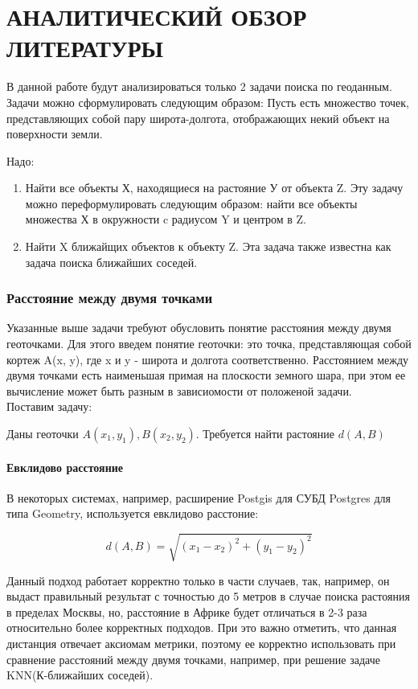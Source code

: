 \chapter{АНАЛИТИЧЕСКИЙ ОБЗОР ЛИТЕРАТУРЫ}
\label{cha:analysis}

В данной работе будут анализироваться только 2 задачи поиска по геоданным. Задачи можно сформулировать следующим образом:
Пусть есть множество точек, представляющих собой пару широта-долгота, отображающих некий объект на поверхности земли.

Надо:
\begin{enumerate}
    \item Найти все объекты Х, находящиеся на растояние У от объекта Z. Эту задачу можно переформулировать следующим образом: найти все объекты множества Х в окружности c радиусом Y и центром в Z.
    \item Найти X ближайщих объектов к объекту Z. Эта задача также известна как задача поиска ближайших соседей.
\end{enumerate}

\subsection{Расстояние между двумя точками}
Указанные выше задачи требуют обусловить понятие расстояния между двумя геоточками. Для этого введем понятие геоточки: это точка, представляющая собой кортеж A(x, y), где x и y - широта и долгота соответственно.
Расстоянием между двумя точками есть наименьшая примая на плоскости земного шара, при этом ее вычисление может быть разным в зависиомости от положеной задачи. \\
Поставим задачу:

Даны геоточки $A(x_1, y_1), B(x_2, y_2)$. Требуется найти растояние $d(A, B)$

\subsubsection{Евклидово расстояние}
В некоторых системах, например, расширение Postgis для СУБД Postgres для типа Geometry, используется евклидово расстоние:

$$
d(A, B)=\sqrt{(x_1-x_2)^2+(y_1-y_2)^2}
$$

Данный подход работает корректно только в части случаев, так, например, он выдаст правильный результат с точностью до 5 метров в случае поиска растояния в пределах Москвы, но, расстояние в Африке будет отличаться в 2-3 раза относительно более корректных подходов.
При это важно отметить, что данная дистанция отвечает аксиомам метрики, поэтому ее корректно использовать при сравнение расстояний между двумя точками, например, при решение задаче KNN(К-ближайших соседей).

